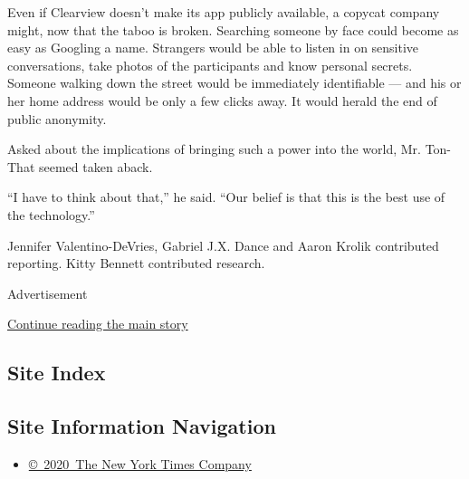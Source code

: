 Even if Clearview doesn't make its app publicly available, a copycat
company might, now that the taboo is broken. Searching someone by face
could become as easy as Googling a name. Strangers would be able to
listen in on sensitive conversations, take photos of the participants
and know personal secrets. Someone walking down the street would be
immediately identifiable --- and his or her home address would be only a
few clicks away. It would herald the end of public anonymity.

Asked about the implications of bringing such a power into the world,
Mr. Ton-That seemed taken aback.

``I have to think about that,'' he said. ``Our belief is that this is
the best use of the technology.''

Jennifer Valentino-DeVries, Gabriel J.X. Dance and Aaron Krolik
contributed reporting. Kitty Bennett contributed research.

Advertisement

\protect\hyperlink{after-bottom}{Continue reading the main story}

\hypertarget{site-index}{%
\subsection{Site Index}\label{site-index}}

\hypertarget{site-information-navigation}{%
\subsection{Site Information
Navigation}\label{site-information-navigation}}

\begin{itemize}
\tightlist
\item
  \href{https://help.nytimes3xbfgragh.onion/hc/en-us/articles/115014792127-Copyright-notice}{©~2020~The
  New York Times Company}
\end{itemize}

